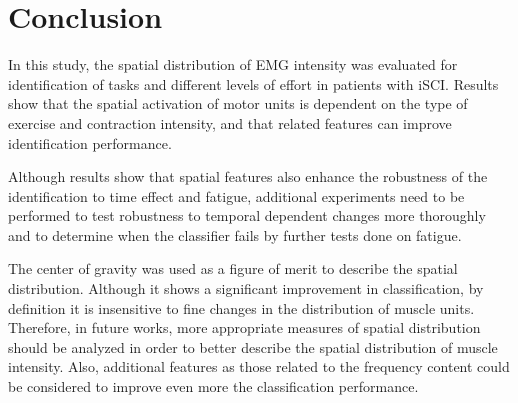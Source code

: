\section{Conclusion}
In this study, the spatial distribution of EMG intensity was evaluated for identification of tasks and different levels of effort in patients with iSCI. Results show that the spatial activation of motor units is dependent on the type of exercise and contraction intensity, and that related features can improve identification performance.

Although results show that spatial features also enhance the robustness of the identification to time effect and fatigue, additional experiments need to be performed to test robustness to temporal dependent changes more thoroughly and to determine when the classifier fails by further tests done on fatigue.

The center of gravity was used as a figure of merit to describe the spatial distribution. Although it shows a significant improvement in classification, by definition it is insensitive to fine changes in the distribution of muscle units. Therefore, in future works, more appropriate measures of spatial distribution should be analyzed in order to better describe the spatial distribution of muscle intensity. Also, additional features as those related to the frequency content could be considered to improve even more the classification performance.



